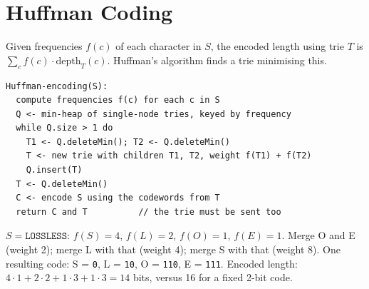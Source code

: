 \section{Huffman Coding}

Given frequencies $f(c)$ of each character in $S$, the encoded length using trie
$T$ is $\sum_c f(c) \cdot \text{depth}_T(c)$. Huffman's algorithm finds a trie
minimising this.

\begin{lstlisting}
Huffman-encoding(S):
  compute frequencies f(c) for each c in S
  Q <- min-heap of single-node tries, keyed by frequency
  while Q.size > 1 do
    T1 <- Q.deleteMin(); T2 <- Q.deleteMin()
    T <- new trie with children T1, T2, weight f(T1) + f(T2)
    Q.insert(T)
  T <- Q.deleteMin()
  C <- encode S using the codewords from T
  return C and T          // the trie must be sent too
\end{lstlisting}

\begin{example}
$S = \texttt{LOSSLESS}$: $f(S) = 4$, $f(L) = 2$, $f(O) = 1$, $f(E) = 1$.
Merge O and E (weight 2); merge L with that (weight 4); merge S with that
(weight 8). One resulting code: S = \texttt{0}, L = \texttt{10}, O = \texttt{110},
E = \texttt{111}. Encoded length: $4\cdot1 + 2\cdot2 + 1\cdot3 + 1\cdot3 = 14$ bits,
versus 16 for a fixed 2-bit code.
\begin{center}
\end{center}
\end{example}

